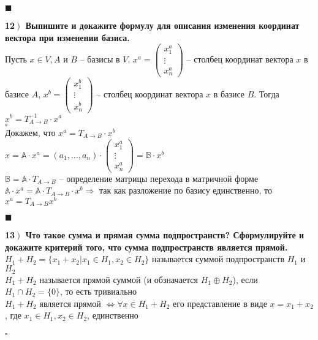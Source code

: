 \documentclass[a4paper,12pt]{article}
\begin{document}
\begin{flushright}
	$\blacksquare$
\end{flushright}
\textbf{12$\left.\right)$ Выпишите и докажите формулу для описания изменения координат вектора при изменении базиса.}\\Пусть $x\in V, A$ и $B$ -- базисы в $V$. $x^a=\begin{pmatrix}
x_1^a\\
\vdots\\
x_n^a
\end{pmatrix}$ -- столбец координат вектора $x$ в базисе $A$, $x^b=\begin{pmatrix}
x_1^b\\
\vdots\\
x_n^b
\end{pmatrix}$ -- столбец координат вектора $x$ в базисе $B$. Тогда $x^b=T_{A\rightarrow B}^{-1}\cdot x^a$\\
$\square$\\
Докажем, что $x^a=T_{A\rightarrow B}\cdot x^b$\\
$x=\mathbb{A}\cdot x^a=(a_1, \ldots, a_n)\cdot\begin{pmatrix}
x_1^a\\
\vdots\\
x_n^a
\end{pmatrix}=\mathbb{B}\cdot x^b$\\
$\mathbb{B}=\mathbb{A}\cdot T_{A\rightarrow B}$ -- определение матрицы перехода в матричной форме\\
$\mathbb{A}\cdot x^a=\mathbb{A}\cdot T_{A\rightarrow B}\cdot x^b\Rightarrow$ так как разложение по базису единственно, то $x^a=T_{A\rightarrow B}x^b$
\begin{flushright}
	$\blacksquare$
\end{flushright}	
\textbf{13$\left.\right)$ Что такое сумма и прямая сумма подпространств? Сформулируйте и докажите критерий того, что сумма подпространств является прямой.}\\ $H_1+H_2=\{x_1+x_2|x_1\in H_1, x_2\in H_2 \}$ называется суммой подпространств $H_1$ и $H_2$ \\$H_1+H_2$ называется прямой суммой (и обзначается $H_1\oplus H_2$), если $H_1\cap H_2=\{0\}$, то есть тривиально\\$H_1+H_2$ является прямой $\Leftrightarrow \forall x\in H_1+H_2$ его представление в виде $x=x_1+x_2$, где $x_1\in H_1, x_2\in H_2$, единственно\\ \\
$\square$\\
\end{document}
